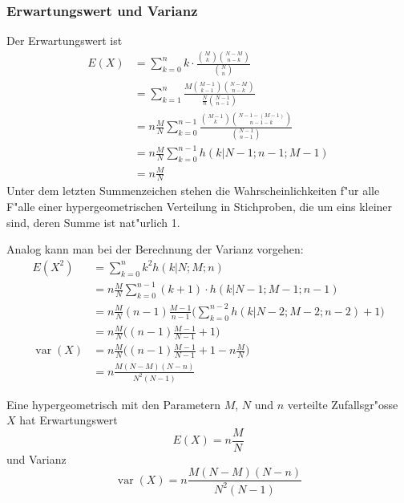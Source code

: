 \subsubsection{Erwartungswert und Varianz}
Der Erwartungswert ist
\begin{align*}
E(X)
&=\sum_{k=0}^n k\cdot\frac{\binom{M}{k}\binom{N-M}{n-k}}{\binom{N}{n}}\\
&=\sum_{k=1}^n \frac{M\binom{M-1}{k-1}\binom{N-M}{n-k}}{\frac{N}{n}\binom{N-1}{n-1}}\\
&=n\frac{M}{N}\sum_{k=0}^{n-1} \frac{\binom{M-1}{k}\binom{N-1-(M-1)}{n-1-k}}{\binom{N-1}{n-1}}\\
&=n\frac{M}{N}\sum_{k=0}^{n-1}h(k|N-1;n-1;M-1)\\
&=n\frac{M}{N}
\end{align*}
Unter dem letzten Summenzeichen stehen die Wahrscheinlichkeiten f"ur alle
F"alle einer hypergeometrischen Verteilung in Stichproben, die um eins kleiner
sind, deren Summe ist nat"urlich 1.

Analog kann man bei der Berechnung der Varianz vorgehen:
\begin{align*}
E(X^2)
&=\sum_{k=0}^n k^2h(k|N;M;n)\\
&=n\frac{M}{N}\sum_{k=0}^{n-1} (k+1)\cdot h(k|N-1;M-1;n-1)\\
&=n\frac{M}{N}(n-1)\frac{M-1}{n-1}\biggl(\sum_{k=0}^{n-2} h(k|N-2;M-2;n-2)+1\biggr)\\
&=n\frac{M}{N}\biggl((n-1)\frac{M-1}{N-1}+1\biggr)\\
\operatorname{var}(X)
&=n\frac{M}{N}\biggl((n-1)\frac{M-1}{N-1}+1-n\frac{M}{N}\biggr)\\
&=n\frac{M(N-M)(N-n)}{N^2(N-1)}
\end{align*}
\begin{satz}
Eine hypergeometrisch mit den Parametern $M$, $N$ und $n$
verteilte Zufallsgr"osse $X$
hat Erwartungswert
\[
E(X)=n\frac{M}{N}
\]
und Varianz
\[
\operatorname{var}(X)=n\frac{M(N-M)(N-n)}{N^2(N-1)}
\]
\end{satz}
